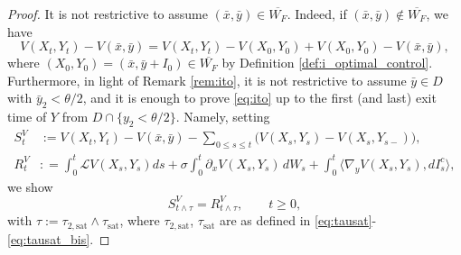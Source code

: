 \documentclass[10pt]{article}
\numberwithin{equation}{section}
\theoremstyle{plain}
\numberwithin{theorem}{section}
\theoremstyle{definition}
\newcommand{\<}{\langle}
\renewcommand{\>}{\rangle}
\renewcommand{\(}{\left(}
\renewcommand{\)}{\right)}
\def\cL{{\mathcal L}}
\begin{document}
{{{\begin{proof}
It is not restrictive to assume $(\bar x, \bar y) \in \overline{W_{F}}$. Indeed, if $(\bar x, \bar y) {\notin \overline{W_{F}}}$, 
we have
\begin{equation}%
V(X_t, Y_t) - V(\bar x , \bar y ) = V(X_t, Y_t) - V(X_{0}, Y_{0}) + V(X_{0}, Y_{0}) - V(\bar x , \bar y),
\end{equation}
where $(X_{0}, Y_{0})=(\bar x, \bar y+I_0)\in \overline{W_{F}}$ by Definition \ref{def:i_optimal_control}. {Furthermore, in light of Remark \ref{rem:ito}, it is not restrictive to assume $\bar{y}\in D$ with $\bar y_2 < \theta/2$, and it is enough to prove \eqref{eq:ito} up to the first (and last) exit time of $Y$ from $D\cap\{ y_2<\theta/2 \}$. Namely, setting
\begin{align}%
S^V_t &:=  V(X_{t}, Y_{t}) -  V({\bar x,\bar y}) -  \sum_{
{0\le s\le {t}}} \big( V (X_s , Y_s ) - V (X_s , Y_{s-} )  \big), \\
R^V_t &: =  \int_{0}^{t} \cL V (X_s , Y_s ) ds + \sigma \int_0^{t} \partial_x V (X_s , Y_s )\, d W_s + \int_0^{t} \big\langle \nabla_y V (X_s , Y_s ) , d I^c_s \big\rangle ,
\end{align}
we show
\begin{equation}
S^V_{t\wedge \tau} = R^V_{t\wedge \tau}, \qquad t\geq 0,
\label{eq:ito_bis}
\end{equation}
with $\tau:= \tau_{2,\text{sat}}\wedge \tau_{\text{sat}}$, where $\tau_{2,\text{sat}}$, $\tau_{\text{sat}}$ are as defined in \eqref{eq:tausat}-\eqref{eq:tausat_bis}.}

\vspace{2pt}


\end{proof}}}}
\end{document}
